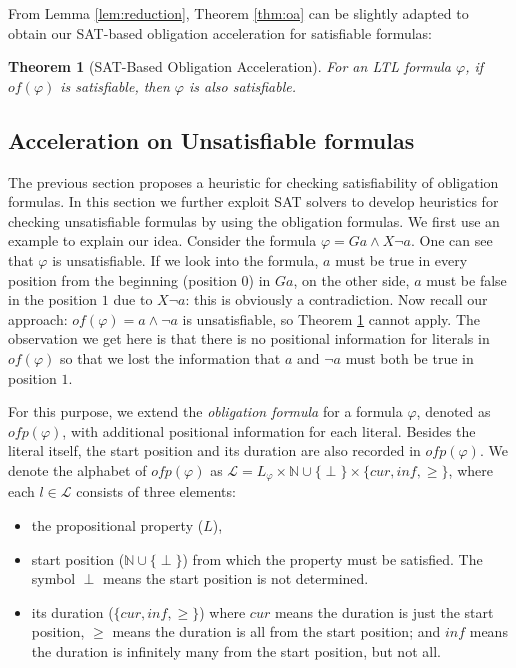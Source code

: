 \documentclass[conference]{IEEEtran}
\newtheorem{theorem}{Theorem}
\newtheorem{proof}{IEEEproof}
\def\olg#1{\mathit{Olg}(#1)}
\def\phi{\varphi}
\def\of#1{\mathit{of}(#1)}
\def\ofp#1{\mathit{ofp}(#1)}
\def\nondeter{\perp}
\def\cur{\mathit{cur}}
\def\inf{\mathit{inf}}
\begin{document}
From Lemma \ref{lem:reduction}, Theorem \ref{thm:oa} can be slightly adapted to obtain 
our SAT-based obligation acceleration for satisfiable formulas:

\begin{theorem}[SAT-Based Obligation Acceleration]\label{thm:satoa}
  For an LTL formula $\phi$, if $\of{\phi}$ is satisfiable, then $\phi$ is also satisfiable. 
\end{theorem}
\iffalse
\begin{proof}
First from Lemma \ref{lem:reduction} we know $\of{\phi}$ is satisfiable implies there exists a 
consistent obligation $O$ in $\olg{\phi}$. Then according to Theorem \ref{thm:oa} we can conclude 
that $\phi$ is satisfiable. 
\end{proof}
\fi


\subsection{Acceleration on Unsatisfiable formulas}
The previous section proposes a heuristic for checking satisfiability
of obligation formulas. In this section we further
exploit SAT solvers to develop heuristics for checking unsatisfiable
formulas by using the obligation formulas. We first use an example to
explain our idea. Consider the formula $\phi=G a \wedge X\neg a$.  One
can see that $\phi$ is unsatisfiable. If we look into the formula, $a$
must be true in every position from the beginning (position $0$) in
$Ga$, on the other side, $a$ must be false in the position $1$ due to
$X\neg a$: this is obviously a contradiction.  Now recall our approach: $\of{\phi} =
a\wedge\neg a$ is unsatisfiable, so Theorem \ref{thm:satoa} cannot
apply. The observation we get here is that there is no
positional information for literals in $\of{\phi}$ so that we lost the
information that $a$ and $\neg a$ must both be true in position $1$.

For this purpose, we extend the \textit{obligation formula} for a
formula $\phi$, denoted as $\ofp{\phi}$, with additional positional
information for each literal. Besides the literal itself, the start
position and its duration are also recorded in $\ofp{\phi}$. We denote
the alphabet of $\ofp{\phi}$ as $\mathcal{L}=L_\phi\times
\mathbb{N}\cup\{\nondeter\}\times\{\cur,\inf,\geq\}$, where
each $l\in
\mathcal{L}$ consists of three elements:
\begin{itemize}
\item the propositional property ($L$),
\item start position ($\mathbb{N}\cup\{\nondeter\}$) from which the property must be
  satisfied. The symbol $\nondeter$ means the start position is not
  determined.
\item its duration ($\{\cur,\inf,\geq\}$) where $\cur$ means the duration
  is just the start position, $\geq$ means the duration is all from
  the start position; and $\inf$ means the duration is
  infinitely many from the start position, but not all. 
\end{itemize}
\end{document}
